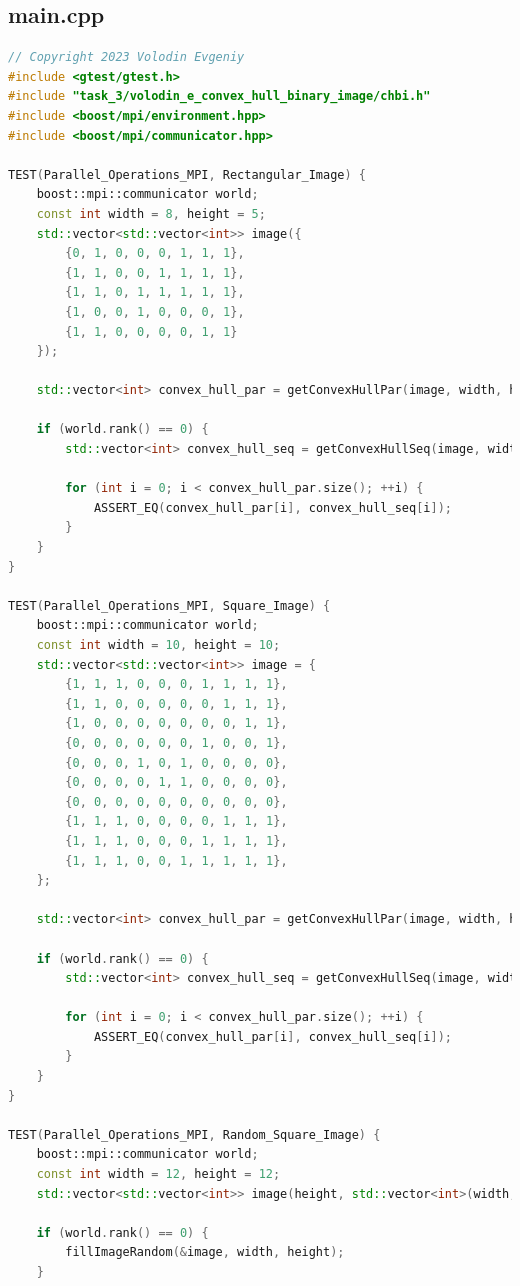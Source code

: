 \documentclass[a4paper, 12pt]{extarticle}
\begin{document}
\subsection*{main.cpp}
	\begin{lstlisting}[language=C++]
// Copyright 2023 Volodin Evgeniy
#include <gtest/gtest.h>
#include "task_3/volodin_e_convex_hull_binary_image/chbi.h"
#include <boost/mpi/environment.hpp>
#include <boost/mpi/communicator.hpp>

TEST(Parallel_Operations_MPI, Rectangular_Image) {
	boost::mpi::communicator world;
	const int width = 8, height = 5;
	std::vector<std::vector<int>> image({
		{0, 1, 0, 0, 0, 1, 1, 1},
		{1, 1, 0, 0, 1, 1, 1, 1},
		{1, 1, 0, 1, 1, 1, 1, 1},
		{1, 0, 0, 1, 0, 0, 0, 1},
		{1, 1, 0, 0, 0, 0, 1, 1}
	});
	
	std::vector<int> convex_hull_par = getConvexHullPar(image, width, height);
	
	if (world.rank() == 0) {
		std::vector<int> convex_hull_seq = getConvexHullSeq(image, width, height);
		
		for (int i = 0; i < convex_hull_par.size(); ++i) {
			ASSERT_EQ(convex_hull_par[i], convex_hull_seq[i]);
		}
	}
}

TEST(Parallel_Operations_MPI, Square_Image) {
	boost::mpi::communicator world;
	const int width = 10, height = 10;
	std::vector<std::vector<int>> image = {
		{1, 1, 1, 0, 0, 0, 1, 1, 1, 1},
		{1, 1, 0, 0, 0, 0, 0, 1, 1, 1},
		{1, 0, 0, 0, 0, 0, 0, 0, 1, 1},
		{0, 0, 0, 0, 0, 0, 1, 0, 0, 1},
		{0, 0, 0, 1, 0, 1, 0, 0, 0, 0},
		{0, 0, 0, 0, 1, 1, 0, 0, 0, 0},
		{0, 0, 0, 0, 0, 0, 0, 0, 0, 0},
		{1, 1, 1, 0, 0, 0, 0, 1, 1, 1},
		{1, 1, 1, 0, 0, 0, 1, 1, 1, 1},
		{1, 1, 1, 0, 0, 1, 1, 1, 1, 1},
	};
	
	std::vector<int> convex_hull_par = getConvexHullPar(image, width, height);
	
	if (world.rank() == 0) {
		std::vector<int> convex_hull_seq = getConvexHullSeq(image, width, height);
		
		for (int i = 0; i < convex_hull_par.size(); ++i) {
			ASSERT_EQ(convex_hull_par[i], convex_hull_seq[i]);
		}
	}
}

TEST(Parallel_Operations_MPI, Random_Square_Image) {
	boost::mpi::communicator world;
	const int width = 12, height = 12;
	std::vector<std::vector<int>> image(height, std::vector<int>(width, 0));
	
	if (world.rank() == 0) {
		fillImageRandom(&image, width, height);
	}
	

\end{lstlisting}
\end{document}
